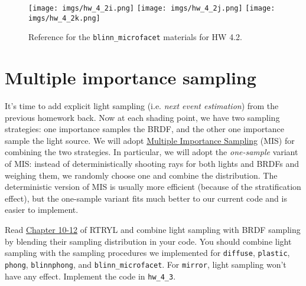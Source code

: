 \begin{figure}[ht]
    \centering
    \texttt{[image: imgs/hw\_4\_2i.png]}
    \texttt{[image: imgs/hw\_4\_2j.png]}
    \texttt{[image: imgs/hw\_4\_2k.png]}
    \caption{Reference for the \lstinline{blinn_microfacet} materials for HW 4.2.}
    \label{fig:hw_4_2_blinn_microfacet}
\end{figure}

\section{Multiple importance sampling}
It's time to add explicit light sampling (i.e. \emph{next event estimation}) from the previous homework back. Now at each shading point, we have two sampling strategies: one importance samples the BRDF, and the other one importance sample the light source. We will adopt \href{https://cseweb.ucsd.edu/~viscomp/classes/cse168/sp21/readings/veach.pdf}{Multiple Importance Sampling} (MIS) for combining the two strategies. In particular, we will adopt the \emph{one-sample} variant of MIS: instead of deterministically shooting rays for both lights and BRDFs and weighing them, we randomly choose one and combine the distribution. The deterministic version of MIS is usually more efficient (because of the stratification effect), but the one-sample variant fits much better to our current code and is easier to implement.

Read \href{https://raytracing.github.io/books/RayTracingTheRestOfYourLife.html#mixturedensities}{Chapter 10-12} of RTRYL and combine light sampling with BRDF sampling by blending their sampling distribution in your code. You should combine light sampling with the sampling procedures we implemented for \lstinline{diffuse}, \lstinline{plastic}, \lstinline{phong}, \lstinline{blinnphong}, and \lstinline{blinn_microfacet}. For \lstinline{mirror}, light sampling won't have any effect. Implement the code in \lstinline{hw_4_3}.

%
%


